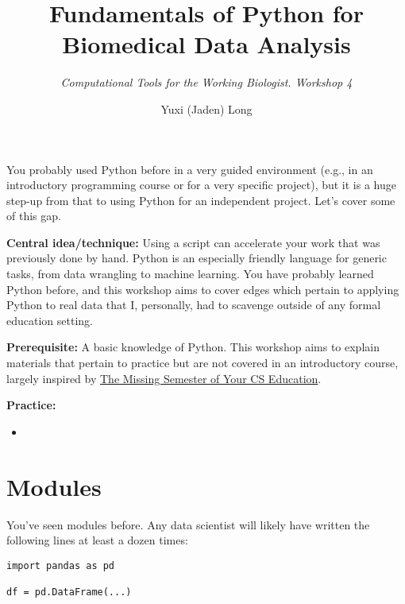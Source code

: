 \documentclass[12pt,letterpaper]{article}
\title{\textbf{Fundamentals of Python for Biomedical Data Analysis}}
\author{\textit{Computational Tools for the Working Biologist. Workshop 4}}
\date{Yuxi (Jaden) Long}
\begin{document}
\maketitle
\thispagestyle{empty}

\vspace{1em}

\noindent


You probably used Python before in a very guided environment (e.g., in an introductory programming course or for a very specific project), but it is a huge step-up from that to using Python for an independent project. Let's cover some of this gap.

\noindent
\textbf{Central idea/technique:} Using a script can accelerate your work that was previously done by hand. Python is an especially friendly language for generic tasks, from data wrangling to machine learning. You have probably learned Python before, and this workshop aims to cover edges which pertain to applying Python to real data that I, personally, had to scavenge outside of any formal education setting.

\textbf{Prerequisite:} A basic knowledge of Python. This workshop aims to explain materials that pertain to practice but are not covered in an introductory course, largely inspired by \href{https://missing.csail.mit.edu/}{The Missing Semester of Your CS Education}.

\textbf{Practice:} \todo{}

\begin{itemize}
   \item \todo{}
\end{itemize}

\section{Modules}

You've seen modules before. Any data scientist will likely have written the following lines at least a dozen times:

\begin{verbatim}
import pandas as pd

df = pd.DataFrame(...)
\end{verbatim}
\end{document}
